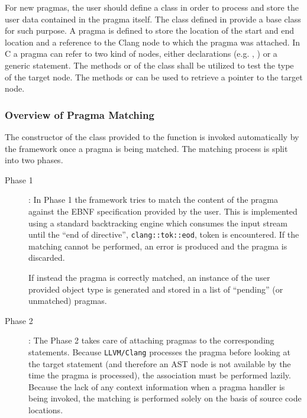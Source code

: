 For new pragmas, the user should define a class in order to process and store
the user data contained in the pragma itself. The class
 defined in 
provide a base class for such purpose. A pragma is defined to store the location
of the start and end location and a reference to the Clang node to which the
pragma was attached. In C a pragma can refer to two kind of nodes, either
declarations (e.g. , ) or a generic
statement. The methods  or  of the
 class shall be utilized to test the type of the
target node. The methods  or  can be used to
retrieve a pointer to the target node. 

\subsubsection{Overview of Pragma Matching}

The constructor of the class provided to the  function
is invoked automatically by the framework once a pragma is being matched. The
matching process is split into two phases.

\begin{description}
\item [Phase 1]: In Phase 1 the framework tries to match the content of the
pragma against the EBNF specification provided by the user. This is implemented
using a standard backtracking engine which consumes the input stream until the
``end of directive'', {\tt clang::tok::eod}, token is encountered. If the
matching cannot be performed, an error is produced and the pragma is discarded.

If instead the pragma is correctly matched, an instance of the user provided
object type is generated and stored in a list of ``pending'' (or unmatched)
pragmas.

\item [Phase 2]: The Phase 2 takes care of attaching pragmas to the
corresponding statements. Because {\tt LLVM/Clang} processes the pragma before
looking at the target statement (and therefore an AST node is not available by
the time the pragma is processed), the association must be performed lazily.
Because the lack of any context information when a pragma handler is being
invoked, the matching is performed solely on the basis of source code
locations. 
\end{description}


